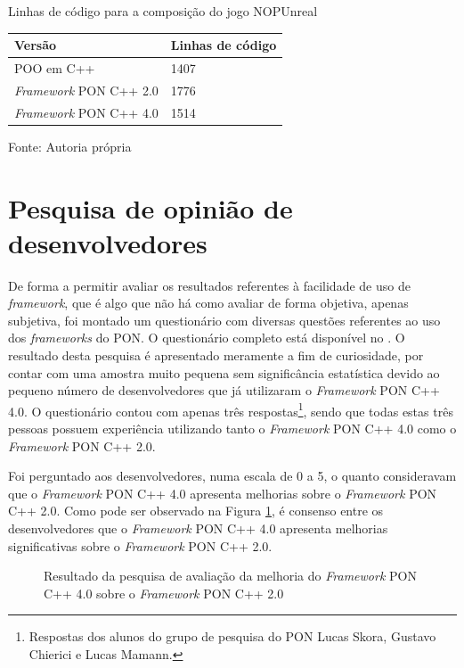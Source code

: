\begin{tabframed}[!htb]
\centering
\caption{Linhas de código para a composição do jogo NOPUnreal}
\smallskip
\begin{tabularx}{0.8\textwidth}{|X|X|}
\hline
Versão & Linhas de código\\
\hline
POO em C++ & 1407 \\
\hline
\textit{Framework} PON C++ 2.0 & 1776 \\
\hline
\textit{Framework} PON C++ 4.0 & 1514 \\
\hline
\end{tabularx}
\caption*{Fonte: Autoria própria}
\label{tab:linhas_de_codigo_nopunreal}
\end{tabframed}

\section{Pesquisa de opinião de desenvolvedores}\label{sec:opiniao}

De forma a permitir avaliar os resultados referentes à facilidade de uso de
\textit{framework}, que é algo que não há como avaliar de forma objetiva, apenas
subjetiva, foi montado um questionário com diversas questões referentes ao uso
dos \textit{frameworks} do PON. O questionário completo está disponível no
. O resultado desta pesquisa é apresentado meramente a
fim de curiosidade, por contar com uma amostra muito pequena sem significância
estatística devido ao pequeno número de desenvolvedores que já utilizaram o
\textit{Framework} PON C++ 4.0. O questionário contou com apenas três
respostas\footnote{Respostas dos alunos do grupo de pesquisa do PON Lucas Skora,
Gustavo Chierici e Lucas Mamann.}, sendo que todas estas três pessoas possuem
experiência utilizando tanto o \textit{Framework} PON C++ 4.0 como o
\textit{Framework} PON C++ 2.0.

Foi perguntado aos desenvolvedores, numa escala de 0 a 5, o quanto consideravam
que o \textit{Framework} PON C++ 4.0 apresenta melhorias sobre o
\textit{Framework} PON C++ 2.0. Como pode ser observado na Figura
\ref{fig:fw_compare}, é consenso entre os desenvolvedores que o
\textit{Framework} PON C++ 4.0 apresenta melhorias significativas sobre o
\textit{Framework} PON C++ 2.0.

\begin{figure}[!htb]
\centering
{}
\caption{Resultado da pesquisa de avaliação da melhoria do \textit{Framework}
PON C++ 4.0 sobre o \textit{Framework} PON C++ 2.0}
\label{fig:fw_compare}
\end{figure}

